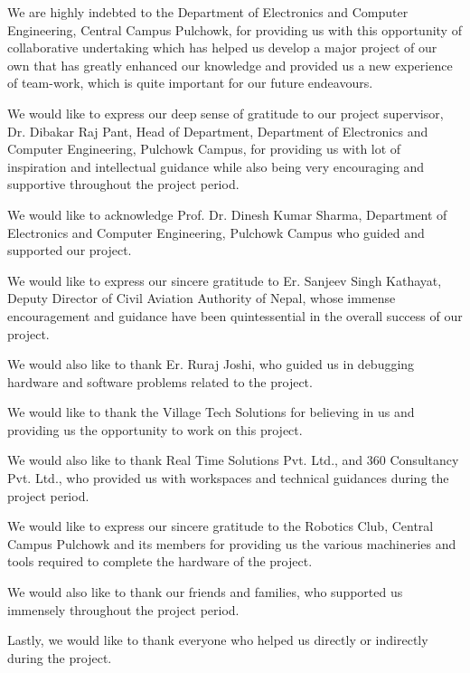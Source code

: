	\vspace{0.5cm}	

We are highly indebted to the Department of Electronics and Computer Engineering, Central Campus Pulchowk, for providing us with this opportunity of collaborative undertaking which has helped us develop a major project of our own that has greatly enhanced our knowledge and provided us a new experience of team-work, which is quite important for our future endeavours.

We would like to express our deep sense of gratitude to our project supervisor, Dr. Dibakar Raj Pant, Head of Department, Department of Electronics and Computer Engineering, Pulchowk Campus, for providing us with lot of inspiration and intellectual guidance while also being very encouraging and supportive throughout the project period.

We would like to acknowledge Prof. Dr. Dinesh Kumar Sharma, Department of Electronics and Computer Engineering, Pulchowk Campus who guided and supported our project.

We would like to express our sincere gratitude to Er. Sanjeev Singh Kathayat, Deputy Director of Civil Aviation Authority of Nepal, whose immense encouragement and guidance have been quintessential in the overall success of our project. 

We would also like to thank Er. Ruraj Joshi, who guided us in debugging hardware and software problems related to the project. 

We would like to thank the Village Tech Solutions for believing in us and providing us the opportunity to work on this project.

We would also like to thank Real Time Solutions Pvt. Ltd., and 360 Consultancy  Pvt. Ltd., who provided us with workspaces and technical guidances during the project period. 

We would like to express our sincere gratitude to the Robotics Club, Central Campus Pulchowk and its members for providing us the various machineries and tools required to complete the hardware of the project.

We would also like to thank our friends and families, who supported us immensely throughout the project period. 

Lastly, we would like to thank everyone who helped us directly or indirectly during the project.